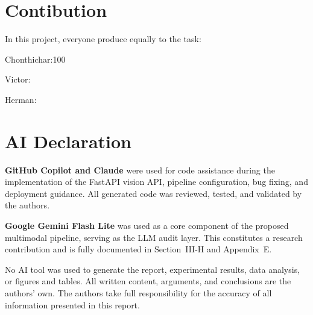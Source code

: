 \documentclass[journal,transmag]{IEEEtran}
\begin{document}
 


\section*{Contibution}

In this project, everyone produce equally to the task:

Chonthichar:100%

Victor:

Herman: 




\section*{AI Declaration}

\textbf{GitHub Copilot and Claude} were used for code assistance during the implementation of the FastAPI vision API, pipeline configuration, bug fixing, and deployment 
guidance. All generated code was reviewed, tested, and 
validated by the authors.

\textbf{Google Gemini Flash Lite} was used as a core component of the proposed multimodal pipeline, serving as the LLM audit layer. This constitutes a research 
contribution and is fully documented in Section~III-H  and Appendix~E.

No AI tool was used to generate the report, experimental results, data analysis, or figures and tables. All written content, arguments, and conclusions are the authors' own. 
The authors take full responsibility for the accuracy of all information presented in this report.


\ifCLASSOPTIONcaptionsoff
  \newpage
\fi





%
%
%


\end{document}
